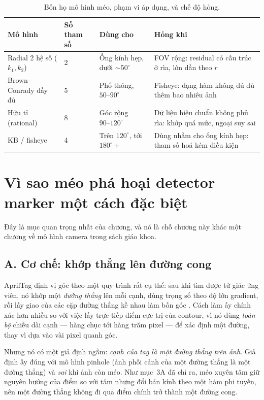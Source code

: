 \documentclass[../../marker.tex]{subfiles}
\begin{document}
\begin{table}[H]\centering\small
\caption{Bốn họ mô hình méo, phạm vi áp dụng, và chế độ hỏng.}
\label{tab:a01-mo-hinh}
\begin{tabularx}{\linewidth}{@{}L{2.5cm}L{2.0cm}L{3.3cm}Y@{}}
\toprule
\textbf{Mô hình} & \textbf{Số tham số} & \textbf{Dùng cho} & \textbf{Hỏng khi}\\
\midrule
Radial 2 hệ số (\(k_1,k_2\)) & 2 & Ống kính hẹp, dưới \(\sim 50^\circ\) & FOV rộng: residual có cấu trúc ở rìa, lớn dần theo \(r\)\\
Brown--Conrady đầy đủ & 5 & Phổ thông, \(50\text{--}90^\circ\) & Fisheye: dạng hàm không đủ dù thêm bao nhiêu ảnh\\
Hữu tỉ (rational) & 8 & Góc rộng \(90\text{--}120^\circ\) & Dữ liệu hiệu chuẩn không phủ rìa: khớp quá mức, ngoại suy sai\\
KB / fisheye & 4 & Trên \(120^\circ\), tới \(180^\circ+\) & Dùng nhầm cho ống kính hẹp: tham số hoá kém điều kiện\\
\bottomrule
\end{tabularx}
\end{table}

\section{Vì sao méo phá hoại detector marker một cách đặc biệt}

Đây là mục quan trọng nhất của chương, và nó là chỗ chương này khác một chương về mô hình camera trong sách giáo khoa.

\subsection{A. Cơ chế: khớp thẳng lên đường cong}

AprilTag định vị góc theo một quy trình rất cụ thể: sau khi tìm được tứ giác ứng viên, nó khớp một \emph{đường thẳng} lên mỗi cạnh, dùng trọng số theo độ lớn gradient, rồi lấy giao của các cặp đường thẳng kề nhau làm bốn góc \cite{wang2016apriltag2}. Cách làm ấy chính xác hơn nhiều so với việc lấy trực tiếp điểm cực trị của contour, vì nó dùng \emph{toàn bộ} chiều dài cạnh --- hàng chục tới hàng trăm pixel --- để xác định một đường, thay vì dựa vào vài pixel quanh góc.

Nhưng nó có một giả định ngầm: \emph{cạnh của tag là một đường thẳng trên ảnh}. Giả định ấy đúng với mô hình pinhole (ảnh phối cảnh của một đường thẳng là một đường thẳng) và \emph{sai} khi ảnh còn méo. Như mục~3A đã chỉ ra, méo xuyên tâm giữ nguyên hướng của điểm so với tâm nhưng đổi bán kính theo một hàm phi tuyến, nên một đường thẳng không đi qua điểm chính trở thành một đường cong.
\end{document}
